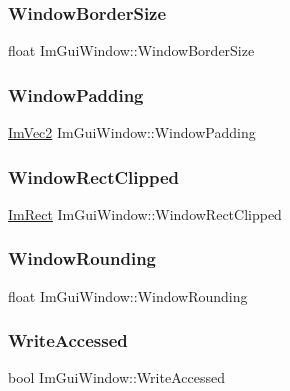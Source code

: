 \hypertarget{struct_im_gui_window_ad51248766b9a815ce20b0d11e13b42b0}{}\label{struct_im_gui_window_ad51248766b9a815ce20b0d11e13b42b0} 
\subsubsection{\texorpdfstring{Window\+Border\+Size}{WindowBorderSize}}
{\footnotesize\ttfamily float Im\+Gui\+Window\+::\+Window\+Border\+Size}

\hypertarget{struct_im_gui_window_a538d3d70ad8f71a4ec58a6a0560b2f02}{}\label{struct_im_gui_window_a538d3d70ad8f71a4ec58a6a0560b2f02} 
\subsubsection{\texorpdfstring{Window\+Padding}{WindowPadding}}
{\footnotesize\ttfamily \hyperlink{struct_im_vec2}{Im\+Vec2} Im\+Gui\+Window\+::\+Window\+Padding}

\hypertarget{struct_im_gui_window_ae0af9ff6c93baad6848143dd9d742ddd}{}\label{struct_im_gui_window_ae0af9ff6c93baad6848143dd9d742ddd} 
\subsubsection{\texorpdfstring{Window\+Rect\+Clipped}{WindowRectClipped}}
{\footnotesize\ttfamily \hyperlink{struct_im_rect}{Im\+Rect} Im\+Gui\+Window\+::\+Window\+Rect\+Clipped}

\hypertarget{struct_im_gui_window_a871ebbbfdf354600a3833c270d6e6ef4}{}\label{struct_im_gui_window_a871ebbbfdf354600a3833c270d6e6ef4} 
\subsubsection{\texorpdfstring{Window\+Rounding}{WindowRounding}}
{\footnotesize\ttfamily float Im\+Gui\+Window\+::\+Window\+Rounding}

\hypertarget{struct_im_gui_window_a3c29e870f485d115e7715e149c4dfc4d}{}\label{struct_im_gui_window_a3c29e870f485d115e7715e149c4dfc4d} 
\subsubsection{\texorpdfstring{Write\+Accessed}{WriteAccessed}}
{\footnotesize\ttfamily bool Im\+Gui\+Window\+::\+Write\+Accessed}


